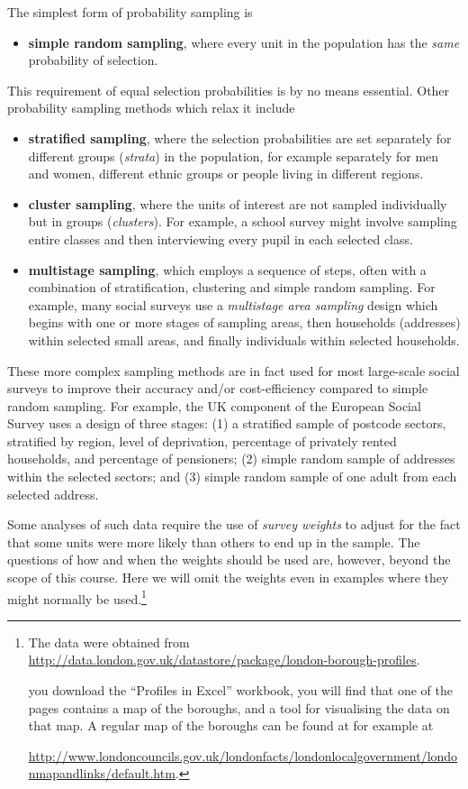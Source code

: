 \documentclass[11pt,a4paper,openany]{book}
\providecommand{\tightlist}{%
  \setlength{\itemsep}{0pt}\setlength{\parskip}{0pt}}
\let\rmarkdownfootnote\footnote%
\def\footnote{\protect\rmarkdownfootnote}
\begin{document}
The simplest form of probability sampling is

\begin{itemize}
\tightlist
\item
  \textbf{simple random sampling}, where every unit in the population
  has the \emph{same} probability of selection.
\end{itemize}

This requirement of equal selection probabilities is by no means
essential. Other probability sampling methods which relax it include

\begin{itemize}
\item
  \textbf{stratified sampling}, where the selection probabilities are
  set separately for different groups (\emph{strata}) in the population,
  for example separately for men and women, different ethnic groups or
  people living in different regions.
\item
  \textbf{cluster sampling}, where the units of interest are not sampled
  individually but in groups (\emph{clusters}). For example, a school
  survey might involve sampling entire classes and then interviewing
  every pupil in each selected class.
\item
  \textbf{multistage sampling}, which employs a sequence of steps, often
  with a combination of stratification, clustering and simple random
  sampling. For example, many social surveys use a \emph{multistage area
  sampling} design which begins with one or more stages of sampling
  areas, then households (addresses) within selected small areas, and
  finally individuals within selected households.
\end{itemize}

These more complex sampling methods are in fact used for most
large-scale social surveys to improve their accuracy and/or
cost-efficiency compared to simple random sampling. For example, the UK
component of the European Social Survey uses a design of three stages:
(1) a stratified sample of postcode sectors, stratified by region, level
of deprivation, percentage of privately rented households, and
percentage of pensioners; (2) simple random sample of addresses within
the selected sectors; and (3) simple random sample of one adult from
each selected address.

Some analyses of such data require the use of \emph{survey weights} to
adjust for the fact that some units were more likely than others to end
up in the sample. The questions of how and when the weights should be
used are, however, beyond the scope of this course. Here we will omit
the weights even in examples where they might normally be
used.\footnote{The data were obtained from
  \url{http://data.london.gov.uk/datastore/package/london-borough-profiles}.

  \noindentIf you download the ``Profiles in Excel'' workbook, you will
  find that one of the pages contains a map of the boroughs, and a tool
  for visualising the data on that map. A regular map of the boroughs
  can be found at for example at

  \url{http://www.londoncouncils.gov.uk/londonfacts/londonlocalgovernment/londonmapandlinks/default.htm}.}
\end{document}
